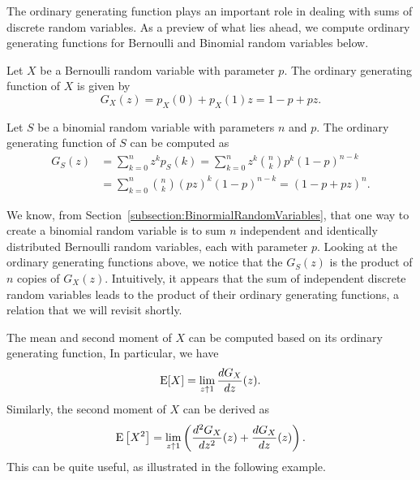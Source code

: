 The ordinary generating function plays an important role in dealing with sums of discrete random variables.
As a preview of what lies ahead, we compute ordinary generating functions for Bernoulli and Binomial random variables below.

\begin{example}
Let $X$ be a Bernoulli random variable with parameter $p$.
The ordinary generating function of $X$ is given by
\begin{equation*}
G_X(z) = p_X(0) + p_X(1) z
= 1 - p + pz .
\end{equation*}
\end{example}

\begin{example}
Let $S$ be a binomial random variable with parameters $n$ and $p$.
The ordinary generating function of $S$ can be computed as
\begin{equation*}
\begin{split}
G_S(z) &= \sum_{k=0}^{n} z^k p_S (k)
= \sum_{k=0}^{n} z^k \binom{n}{k} p^k (1 - p)^{n-k} \\
&= \sum_{k=0}^{n} \binom{n}{k} (pz)^k (1 - p)^{n-k}
= (1 - p + pz)^n .
\end{split}
\end{equation*}
\end{example}

We know, from Section~\ref{subsection:BinormialRandomVariables}, that one way to create a binomial random variable is to sum $n$ independent and identically distributed Bernoulli random variables, each with parameter $p$.
Looking at the ordinary generating functions above, we notice that the $G_S(z)$ is the product of $n$ copies of $G_X(z)$.
Intuitively, it appears that the sum of independent discrete random variables leads to the product of their ordinary generating functions, a relation that we will revisit shortly.

The mean and second moment of $X$ can be computed based on its ordinary generating function,
In particular, we have
\begin{equation*}
\mathrm{E} [X] = \lim_{z \uparrow 1} \frac{d G_X}{dz}(z) .
\end{equation*}
Similarly, the second moment of $X$ can be derived as
\begin{equation*}
\mathrm{E} \left[ X^2 \right]
= \lim_{z \uparrow 1} \left( \frac{d^2 G_X}{dz^2}(z) + \frac{d G_X}{dz}(z) \right) .
\end{equation*}
This can be quite useful, as illustrated in the following example.

